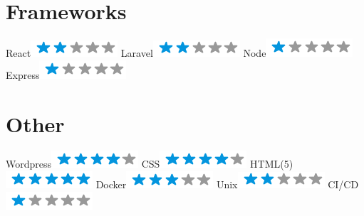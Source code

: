 \begin{aside}
    \section{Frameworks}
      React\includegraphics[scale=0.40]{img/2stars.png}
      Laravel\includegraphics[scale=0.40]{img/2stars.png}
      Node\includegraphics[scale=0.40]{img/1stars.png}
      Express\includegraphics[scale=0.40]{img/1stars.png}
    \section{Other}
      Wordpress\includegraphics[scale=0.40]{img/4stars.png}
      CSS\includegraphics[scale=0.40]{img/4stars.png}
      HTML(5)\includegraphics[scale=0.40]{img/5stars.png}
      Docker\includegraphics[scale=0.40]{img/3stars.png}
      Unix\includegraphics[scale=0.40]{img/2stars.png}
      CI/CD\includegraphics[scale=0.40]{img/1stars.png}
  \end{aside}

